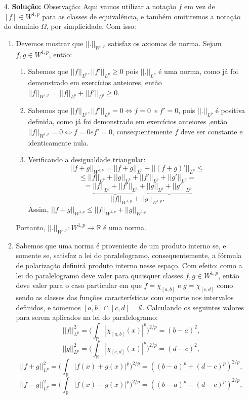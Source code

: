 \documentclass{article}
\begin{document}
\begin{enumerate}
		\item[4.] \textbf{Solução:} Observação: Aqui vamos utilizar a notação $f$ em vez de $[f] \in W^{1,p}$ para as classes de equivalência, e também omitiremos a notação do domínio $\Omega$, por simplicidade. Com isso:
			\begin{enumerate}
				\item Devemos mostrar que $||.||_{W^{1,p}}$ satisfaz os axiomas de norma. Sejam $f, g \in W^{1,p}$, então:
				\begin{enumerate}
					\item Sabemos que  $||f||_{L^{p}}, ||f'||_{L^{p}} \geq 0$ pois $||.||_{L^{p}}$ é uma norma, como já foi demonstrado em exercícios anteiores, então $||f||_{W^{1,p}} = ||f||_{L^{p}} + ||f'||_{L^{p}} \geq 0$.
					
					\item Sabemos que $||f||_{L^{p}}, ||f'||_{L^{p}} = 0 \iff f=0 \;\ e \; f'=0$, pois $||.||_{L^{p}}$ é positiva definida, como já foi demonstrado em exercícios anteiores ,então $||f||_{W^{1,p}} = 0 \iff f = 0 e f' =0$, consequentemente $f$ deve ser constante e identicamente nula.
					
					\item Verificando a desigualdade triangular: 
					$$
					||f + g||_{W^{1,p}} =  ||f+g||_{L^{p}} + ||(f + g)'||_{L^{p}} \leq
					$$
					$$ \leq ||f||_{L^{p}}+||g||_{L^{p}}+||f'||_{L^{p}}+||g'||_{L^{p}} =  
					$$
					$$
					=\underbrace{||f||_{L^{p}}+||f'||_{L^{p}}} + \underbrace{||g||_{L^{p}}+||g'||_{L^{p}}}
					$$
					$$
					||f ||_{W^{1,p}}+|| g||_{W^{1,p}}.
					$$ 
					Assim, $||f + g||_{W^{1,p}} \leq ||f ||_{W^{1,p}}+|| g||_{W^{1,p}}$
					
				\end{enumerate}
				Portanto, $||. ||_{W^{1,p}}: W^{1,p} \to \mathbb{R}$ é uma norma.
				
				\item Sabemos que uma norma é proveniente de um produto interno se, e somente se, satisfaz a lei do paralelogramo, consequentemente, a fórmula de polarização definirá produto interno nesse espaço. Com efeito: como a lei do paralelogramo deve valer para quaisquer classes $f, g \in W^{1,p}$, então deve valer para o caso particular em que $f = \chi_{[a,b]}$ e $g = \chi_{[c,d]}$ como sendo as classes das funções características com suporte nos intervalos definidos, e tomemos $[a,b] \cap [c,d] = \emptyset$. Calculando os seguintes valores para serem aplicados na lei do paralelogramo: 
				$$
				||f||_{L^{p}}^{2} = \Big( \int_{\mathbb{R}} |\chi_{[a,b]}(x)|^{p} \Big)^{2/p} = (b-a)^{2},
				$$
				$$  
				||g||_{L^{p}}^{2} = \Big( \int_{\mathbb{R}} |\chi_{[c,d]}(x)|^{p} \Big)^{2/p} = (d-c)^{2},
				$$
				$$
				||f +g||_{L^{p}}^{2} = \Big (\int_{\mathbb{R}}|f(x)+g(x)|^{p} \Big)^{2/p} =((b-a)^{p}+(d-c)^{p})^{2/p},
				$$
				$$
				||f -g||_{L^{p}}^{2} = \Big (\int_{\mathbb{R}}|f(x)-g(x)|^{p} \Big)^{2/p} =((b-a)^{p}-(d-c)^{p})^{2/p},
				$$
				

\end{enumerate}
\end{enumerate}
\end{document}
